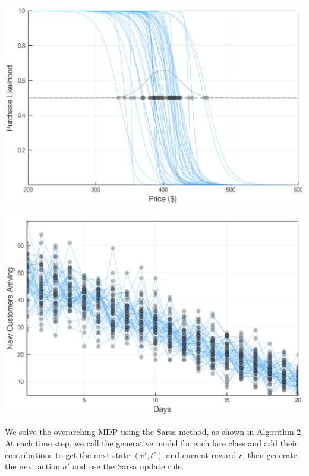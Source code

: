 \documentclass[10pt,letterpaper]{article}
\newenvironment{Figure}
{\par\medskip\noindent\minipage{\linewidth}}
{\endminipage\par\medskip}
\begin{document}
\begin{multicols*}{2}
\begin{Figure}
    \centering
    \includegraphics[width=0.9\linewidth]{plots/customer_price_schedule.png}
	\setlength{\belowcaptionskip}{-10pt}
    \label{fig:pricing-dynamics-example}
\end{Figure}
\vspace*{-0.1in}
\begin{Figure}
    \centering
    \includegraphics[width=0.9\linewidth]{plots/customer_arrival.png}
    \setlength{\belowcaptionskip}{-10pt}
    \label{fig:arrival-dynamics-example}
\end{Figure}

We solve the overarching MDP using the Sarsa method, as shown in \hyperref[alg:solve-mdp]{Algorithm 2}. At each time step, we call the generative model for each fare class and add their contributions to get the next state $(v',t')$ and current reward $r$, then generate the next action $a'$ and use the Sarsa update rule.


\end{multicols*}
\end{document}
